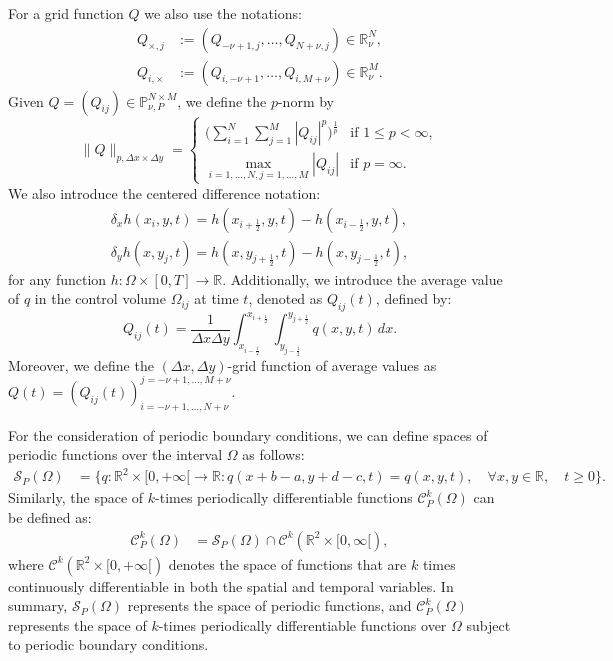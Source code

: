 For a grid function $Q$ we also use the notations:
\begin{align*}
Q_{\times,j} &:= (Q_{-\nu+1,j}, \ldots, Q_{N+\nu,j}) \in \mathbb{R}^N_{\nu},\\
Q_{i,\times} &:= (Q_{i,-\nu+1}, \ldots, Q_{i,M+\nu}) \in \mathbb{R}^M_{\nu}.
\end{align*}
Given $Q = (Q_{ij})\in \mathbb{P}^{N \times M}_{\nu, P}$, we define the $p$-norm by
\begin{equation}
	\label{chp-adv2d-pnorm}
	\|Q\|_{p,\Delta x \times \Delta y}=
	\begin{cases}
		\bigg( \sum_{i=1}^{N} \sum_{j=1}^{M}|Q_{ij}|^p \bigg)^{\frac{1}{p}} & \text{if } 1\leq p < \infty,\\
		\max_{i=1, \ldots, N,j=1,\ldots,M}{|Q_{ij}|} & \text{if } p=\infty.
	\end{cases}
\end{equation}
We also introduce the centered difference notation:
\begin{align}
	\label{sec-adv2d:eq6}
	\delta_x {h}(x_i,y, t) = 
	{h}(x_{i+\frac{1}{2}}, y, t) - 
	{h}(x_{i-\frac{1}{2}}, y, t), \\
	\delta_y {h}(x, y_j,t) = 
    {h}(x, y_{j+\frac{1}{2}},t) - 
    {h}(x, y_{j-\frac{1}{2}},t),
\end{align}
for any function $h: \Omega \times [0,T] \to \mathbb{R}$.
Additionally, we introduce the average value of $q$ in the control volume
$\Omega_{ij}$ at time $t$, denoted as ${Q}_{ij}(t)$, defined by:
\begin{equation}
	\label{chp-adv2d-sec1-not2}
	{Q}_{ij}(t) = \frac{1}{\Delta x \Delta y}
	\int_{x_{i-\frac{1}{2}}}^{x_{i+\frac{1}{2}}} \int_{y_{j-\frac{1}{2}}}^{y_{j+\frac{1}{2}}} {q}(x,y,t) \,dx.
\end{equation}
Moreover, we define the $(\Delta x, \Delta y)$-grid function of average values as $Q(t) = (Q_{ij}(t))_{i=-\nu+1,\ldots,N+\nu}^{j=-\nu+1,\ldots,M+\nu}$.

For the consideration of periodic boundary conditions, we can define spaces of periodic functions over 
the interval $\Omega$ as follows:
\begin{align*}
	\mathcal{S}_P(\Omega) &= \{q:\mathbb{R}^2\times[0,+\infty[\to \mathbb{R}: q(x+b-a,y+d-c,t)=q(x,y,t), \quad \forall x,y \in \mathbb{R}, \quad t\geq0\}.
\end{align*}
Similarly, the space of $k$-times periodically differentiable functions $\mathcal{C}_P^k(\Omega)$ can be defined as:
\begin{align*}
	\mathcal{C}_P^k(\Omega) &= \mathcal{S}_P(\Omega) \cap \mathcal{C}^k(\mathbb{R}^2\times[0,\infty[),
\end{align*}
where $\mathcal{C}^k(\mathbb{R}^2\times[0,+\infty[)$ denotes the space of functions that are $k$ 
times continuously differentiable in both the spatial and temporal variables.
In summary, $\mathcal{S}_P(\Omega)$ represents the space of periodic functions, and $\mathcal{C}_P^k(\Omega)$
represents the space of $k$-times periodically differentiable functions over $\Omega$ subject to periodic boundary conditions.

